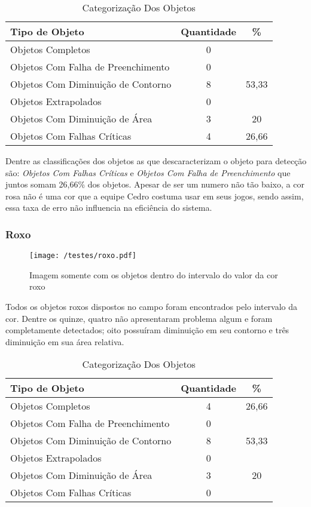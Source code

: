 	\begin{table}[h]
\centering
\begin{tabular}{l|c|c}
Tipo de Objeto & Quantidade  & \% \\ %
\hline                               %
Objetos Completos &  0\\
\hline 
Objetos Com Falha de Preenchimento & 0\\
\hline 
Objetos Com Diminuição de Contorno & 8& 53,33
 \\
\hline 
Objetos Extrapolados & 0 \\
\hline 
Objetos Com Diminuição de Área & 3 & 20\\
\hline 
Objetos Com Falhas Críticas & 4 & 26,66 \\
\hline 
\end{tabular}
\caption{Categorização Dos Objetos}
\end{table}

Dentre as classificações dos objetos as que descaracterizam o objeto para detecção são:  \textit{Objetos Com Falhas Críticas} e \textit{Objetos Com Falha de Preenchimento} que juntos somam 26,66\% dos objetos. Apesar de ser um numero não tão baixo, a cor rosa não é uma cor que a equipe Cedro costuma usar em seus jogos, sendo assim, essa taxa de erro não influencia na eficiência do sistema.
\subsubsection{Roxo}
\begin{figure}[H]
		\centering
		\texttt{[image: /testes/roxo.pdf]}
		\caption{Imagem somente com os objetos dentro do intervalo do valor da cor roxo}
		\label{disposicaoparte}
	\end{figure}

Todos os objetos roxos dispostos no campo foram encontrados pelo intervalo da cor. Dentre os quinze, quatro não apresentaram problema algum e foram completamente detectados; oito possuíram diminuição em seu contorno e três diminuição em sua área relativa.
\begin{table}[h]
\centering
\begin{tabular}{l|c|c}
Tipo de Objeto & Quantidade  & \% \\ %
\hline                               %
Objetos Completos &  4 & 26,66\\
\hline 
Objetos Com Falha de Preenchimento & 0 \\
\hline 
Objetos Com Diminuição de Contorno &  8 & 53,33\\
\hline 
Objetos Extrapolados & 0 \\
\hline 
Objetos Com Diminuição de Área & 3 & 20\\
\hline 
Objetos Com Falhas Críticas & 0 \\
\hline 
\end{tabular}
\caption{Categorização Dos Objetos}
\end{table}
	
